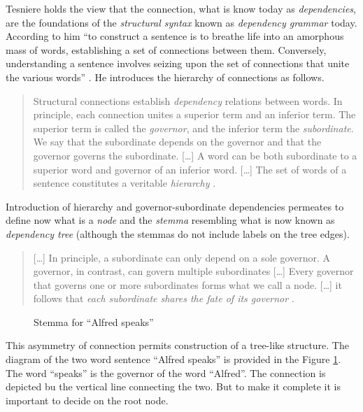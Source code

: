 Tesniere holds the view that the connection, what is know today as \textit{dependencies}, are the foundations of the \textit{structural syntax} known as \textit{dependency grammar} today. According to him ``to construct a sentence is to breathe life into an amorphous mass of words, establishing a set of connections between them. Conversely, understanding a sentence involves seizing upon the set of connections that unite the various words'' \citep[4]{Tesniere2015}. He introduces the hierarchy of connections as follows. 

\begin{quotation}
    Structural connections establish \textit{dependency} relations between words. In principle, each connection unites a superior term and an inferior term. The superior term is called the \textit{governor}, and the inferior term the \textit{subordinate}. We say that the subordinate depends on the governor and that the governor governs the subordinate. [\dots] A word can be both subordinate to a superior word and governor of an inferior word. [\dots] The set of words of a sentence constitutes a veritable \textit{hierarchy} \citep[5--6]{Tesniere2015}.
\end{quotation}

Introduction of hierarchy and governor-subordinate dependencies permeates to define now what is a \textit{node} and the \textit{stemma} resembling what is now known as \textit{dependency tree} (although the stemmas do not include labels on the tree edges). 

\begin{quotation}
    [\dots] In principle, a subordinate can only depend on a sole governor. A governor, in contrast, can govern multiple subordinates [\dots] Every governor that governs one or more subordinates forms what we call a node. [\dots] it follows that \textit{each subordinate shares the fate of its governor} \citep[6]{Tesniere2015}.
\end{quotation}

\begin{figure}[!ht]
    \centering
    \caption{Stemma for ``Alfred speaks''}
    \label{fig:stemma1}
\end{figure}

This asymmetry of connection permits construction of a tree-like structure. The diagram of the two word sentence ``Alfred speaks'' is provided in the Figure \ref{fig:stemma1}. The word ``speaks'' is the governor of the word ``Alfred''. The connection is depicted bu the vertical line connecting the two. But to make it complete it is important to decide on the root node. 

